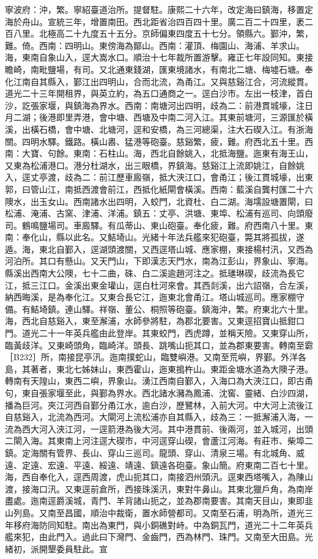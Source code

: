 \begin{pinyinscope}
寧波府：沖，繁。寧紹臺道治所。提督駐。康熙二十六年，改定海曰鎮海，移置定海於舟山。宣統三年，增置南田。西北距省治四百四十里。廣二百二十四里，袤二百八里。北極高二十九度五十五分。京師偏東四度五十七分。領縣六。鄞沖，繁，難。倚。西南：四明山。東傍海為鄮山。西南：灌頂、梅園山、海浦、羊求山。海，東南自象山入，逕大嵩水口。順治十七年裁所置游擊。雍正七年設同知。東接瞻崎，南毗鹽場，有司。又北通東錢湖，匯東境諸水，有南北二塘、梅墟石塘。奉化江南自其縣入，鄞江出四明山，合而北流，為甬江。又與慈谿江合，河流縱貫。道光二十三年開租界，與英立約，為五口通商之一。逕白沙巿。左出一枝津，首白沙，訖張家堰，與鎮海為界水。西南：南塘河出四明，歧為二：前港貫城壕，注日月二湖；後港即里弄港，會中塘、西塘及中南二河入江。其東前塘河，三源匯於橫溪，出橫石橋，會中塘、北塘河，逕和安橋，為三河總渠，注大石碶入江。有浙海關。四明水驛。鐵路。橫山嶴、猛港等砲臺。慈谿繁，疲，難。府西北五十里。西南：大寶、句餘。東南：石柱山。海，西北自餘姚入，北抵海鹽。迤東有海王山，又東為松浦港口。港分杜湖水，出三眼橋，界鎮海。慈谿江上流即姚江，自餘姚入，逕丈亭渡，歧為二：前江歷車廄嶺，抵大浹江口，會甬江；後江貫城壕，出東郭，曰管山江，南抵西渡會前江，西抵化紙閘會橫溪。西南：藍溪自龔村匯二十六隩水，出玉女山。西南諸水出四明，入蛟門，北資杜、白二湖。海壖設塘置閘，曰松浦、淹浦、古窯、津浦、洋浦。鎮五：丈亭、洪塘、東埠、松浦有巡司、向頭廢司。鶴鳴鹽場司。車廄驛。有瓜蒂山、東山砲臺。奉化疲，難。府西南八十里。東南：奉化山，縣以此名。又鮚埼山。光緒十年法兵艦來犯砲臺，斃其將孤拔，遂遁。海，東北自鄞入，逕湖頭渡關，又西逕塔山城、應家棚，東接楊村汛，又西為河泊所。其口有懸山。又天門山，下即漢志天門水，南為江彭山，界象山、寧海。縣溪出西南大公隩，七十二曲，硃、白二溪逾趙河注之。抵璡琳碶，歧流為長它江，抵三江口。金溪出東金瓘山，逕白杜河來會。其西剡溪，出六詔嶺，合左溪，納西晦溪，是為奉化江。又東合長它江，迤東北會甬江。塔山城巡司。應家棚守備。有鮚埼鎮。連山驛。祥嶺、董公、桐照等砲臺。鎮海沖，繁。府東北六十里。海，西北自慈谿入，東至澥浦，水師參將駐，為郡北要害。又東逕招寶山抵鉗口門。道光二十一年英兵艦由此登岸。其東蛟門，西虎蹲，並稱天險。又東穿山所，臨黃歧洋。又東崎頭角，臨崎洋。頭長、跳嘴山扼其口，並為郡東要害。轉南至霩［B232］所，南接昆亭汛。迤南撲蛇山，臨雙嶼港。又南至荒嶼，界鄞。外洋各島，其著者，東北七姊妹山，東西霍山，迤東搗杵山。東距金塘水道為大隩子港。轉南有天隍山，東西二嶼，界象山。湧江西南自鄞入，入海口為大浹江口，即古甬句，東自張家堰至此，與鄞為界水。西北諸水瀦為鳳浦、沈窖、靈緒、白沙四湖，播為巨河。夾江河西自鄞分甬江水，逾白沙，歷鷺林，入前大河。中大河上流後江自慈谿入，北流為西河。大閘河上流松浦亦自其縣入，歧為三：一抵澥浦入海，一流為西大河入浹江河，一逕箭港為後大河。其中港貫前、後兩河，並入城河，出頭二閘入海。其東南上河注逕大碶巿，中河逕穿山碶，會蘆江河海。有莊巿、柴埠二鎮。定海關有管界、長山、穿山三巡司。龍頭、穿山、清泉三場。有北城角、威遠、定遠、宏遠、平遠、綏遠、靖遠、鎮遠各砲臺。象山簡。府東南二百七十里。海，西自奉化入，逕西周渡，虎山扼其口，南接泗州頭汛。逕東西塔嘴入，為陳山渡，接海口汛。又東逕前倉所，西接珠溪汛，東對牛鼻山。其東北獵戶角，為南岸盡處。迤南逕爵溪城，青門、羊背諸山扼之，並為郡南要害。其南天目山，東即韭山列島。又南至昌國，順治中裁衛，置水師營都司。又南至石浦，明為所，道光三年移府海防同知駐。南出為東門，與小銅礁對峙。中為銅瓦門，道光二十二年英兵艦來犯，由此門入。過此曰下灣門、金齒門，西為林門、珠門。又南至大田島。光緒初，派開墾委員駐此。宣
\end{pinyinscope}
